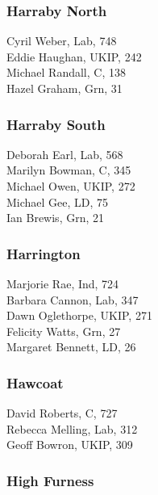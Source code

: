 \documentclass[a4paper,openany,10pt]{book}
\begin{document}
\subsubsection*{Harraby North}



Cyril Weber, Lab, 748\\
Eddie Haughan, UKIP, 242\\
Michael Randall, C, 138\\
Hazel Graham, Grn, 31\\


\subsubsection*{Harraby South}



Deborah Earl, Lab, 568\\
Marilyn Bowman, C, 345\\
Michael Owen, UKIP, 272\\
Michael Gee, LD, 75\\
Ian Brewis, Grn, 21\\


\subsubsection*{Harrington}



Marjorie Rae, Ind, 724\\
Barbara Cannon, Lab, 347\\
Dawn Oglethorpe, UKIP, 271\\
Felicity Watts, Grn, 27\\
Margaret Bennett, LD, 26\\


\subsubsection*{Hawcoat}



David Roberts, C, 727\\
Rebecca Melling, Lab, 312\\
Geoff Bowron, UKIP, 309\\


\subsubsection*{High Furness}
\end{document}

